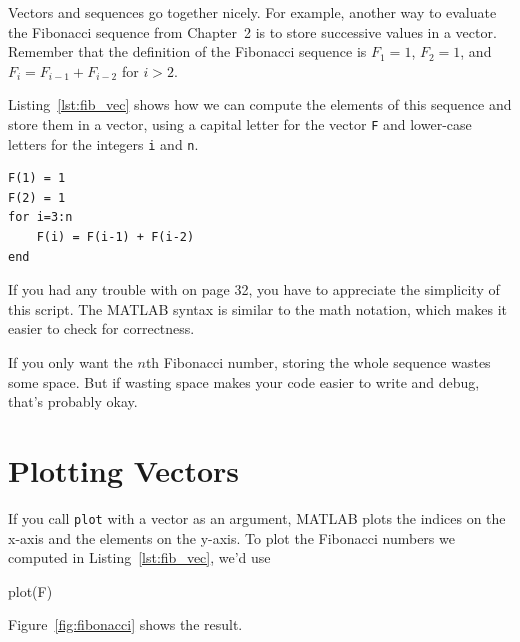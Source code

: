 
Vectors and sequences go together nicely.
For example, another way to evaluate the Fibonacci sequence from Chapter~2 is to
store successive values in a vector.  Remember that the definition of the
Fibonacci sequence is $F_1 = 1$, $F_2 = 1$, and
$F_{i} = F_{i-1} + F_{i-2}$ for $i > 2$.

Listing~\ref{lst:fib_vec} shows how we can compute the elements of this sequence and store them in a vector, using a capital letter for the vector \lstinline{F}
and lower-case letters for the integers \lstinline{i} and \lstinline{n}.
\newpage
\begin{lstlisting}[caption={Calculating the Fibonacci sequence using a vector}, label={lst:fib_vec}]
F(1) = 1
F(2) = 1
for i=3:n
    F(i) = F(i-1) + F(i-2)
end
\end{lstlisting}

If you had any trouble with  on page 32, you have to
appreciate the simplicity of this script.  The MATLAB syntax is
similar to the math notation, which makes it easier to check for
correctness.  

If you only want the $n$th Fibonacci number, storing
the whole sequence wastes some space.  But if wasting space
makes your code easier to write and debug, that's probably okay.


\section{Plotting Vectors}


If you call \lstinline{plot} with a vector as an argument,
MATLAB plots the indices on the x-axis and the elements on the
y-axis.  To plot the Fibonacci numbers we computed in Listing~\ref{lst:fib_vec}, we'd use

\begin{code}
plot(F)
\end{code}

Figure~\ref{fig:fibonacci} shows the result.

